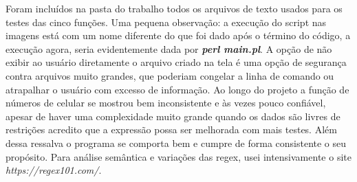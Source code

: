 \documentclass[paper=a4, fontsize=12pt]{scrartcl} %
\numberwithin{equation}{section} %
\numberwithin{figure}{section} %
\numberwithin{table}{section} %
\begin{document}
Foram incluídos na pasta do trabalho todos os arquivos de texto usados para os testes das cinco funções. Uma pequena observação: a execução do script nas imagens está com um nome diferente do que foi dado após o término do código, a execução agora, seria evidentemente dada por \textbf{\textit{perl main.pl}}. A opção de não exibir ao usuário diretamente o arquivo criado na tela é uma opção de segurança contra arquivos muito grandes, que poderiam congelar a linha de comando ou atrapalhar o usuário com excesso de informação. Ao longo do projeto a função de números de celular se mostrou bem inconsistente e às vezes pouco confiável, apesar de haver uma complexidade muito grande quando os dados são livres de restrições acredito que a expressão possa ser melhorada com mais testes. Além dessa ressalva o programa se comporta bem e cumpre de forma consistente o seu propósito. Para análise semântica e variações das regex, usei intensivamente o site \textit{https://regex101.com/}.
\end{document}

